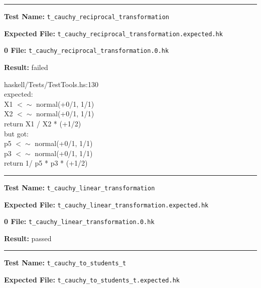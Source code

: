 \documentclass[11pt]{article}
\begin{document}
\hrule

\bigskip
\textbf{Test Name:} {\tt t\_cauchy\_reciprocal\_transformation}

\textbf{Expected File:} {\tt t\_cauchy\_reciprocal\_transformation.expected.hk}

\bigskip


\bigskip
\textbf{0 File:} {\tt t\_cauchy\_reciprocal\_transformation.0.hk}

\bigskip


\bigskip
\textbf{Result:} failed

\bigskip
\noindent


\bigskip
\noindent
haskell/Tests/TestTools.hs:130\\expected:\\X1 $<\sim$ normal(+0/1, 1/1)\\X2 $<\sim$ normal(+0/1, 1/1)\\return X1 / X2 * (+1/2)\\but got:\\p5 $<\sim$ normal(+0/1, 1/1)\\p3 $<\sim$ normal(+0/1, 1/1)\\return 1/ p5 * p3 * (+1/2)\\

\hrule

\bigskip
\textbf{Test Name:} {\tt t\_cauchy\_linear\_transformation}

\textbf{Expected File:} {\tt t\_cauchy\_linear\_transformation.expected.hk}

\bigskip


\bigskip
\textbf{0 File:} {\tt t\_cauchy\_linear\_transformation.0.hk}

\bigskip


\bigskip
\textbf{Result:} passed

\bigskip
\hrule

\bigskip
\textbf{Test Name:} {\tt t\_cauchy\_to\_students\_t}

\textbf{Expected File:} {\tt t\_cauchy\_to\_students\_t.expected.hk}

\bigskip

\end{document}
